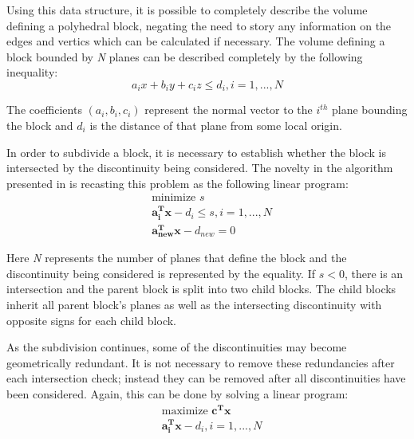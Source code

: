 Using this data structure, it is possible to completely describe the volume defining a polyhedral block, negating the need to story any information on the edges and vertics which can be calculated if necessary. The volume defining a block bounded by \textit{N} planes can be described completely by the following inequality:
\begin{equation}
a_ix + b_iy + c_iz \leq d_i, i = 1,...,N 
\end{equation}

The coefficients $(a_i, b_i, c_i)$ represent the normal vector to the $i^{th}$ plane bounding the block and $d_i$ is the distance of that plane from some local origin. \par
 
In order to subdivide a block, it is necessary to establish whether the block is intersected by the discontinuity being considered. The novelty in the algorithm presented in \cite{slicing} is recasting this problem as the following linear program: 
\begin{equation}
\begin{aligned} 
&\text{minimize } s\\
&\boldsymbol{a_{i}^{T} x} - d_i \leq s, i = 1,...,N\\
&\boldsymbol{a_{new}^{T} x} - d_{new} = 0
\end{aligned}
\end{equation}

Here \textit{N} represents the number of planes that define the block and the discontinuity being considered is represented by the equality. If $s < 0$, there is an intersection and the parent block is split into two child blocks. The child blocks inherit all parent block's planes as well as the intersecting discontinuity with opposite signs for each child block. \par

As the subdivision continues, some of the discontinuities may become geometrically redundant. It is not necessary to remove these redundancies after each intersection check; instead they can be removed after all discontinuities have been considered. Again, this can be done by solving a linear program: 
\begin{equation}
\begin{aligned}
&\text{maximize }\boldsymbol{c^{T} x}\\
&\boldsymbol{a_{i}^{T} x} - d_{i}, i = 1,...,N
\end{aligned}
\end{equation}

